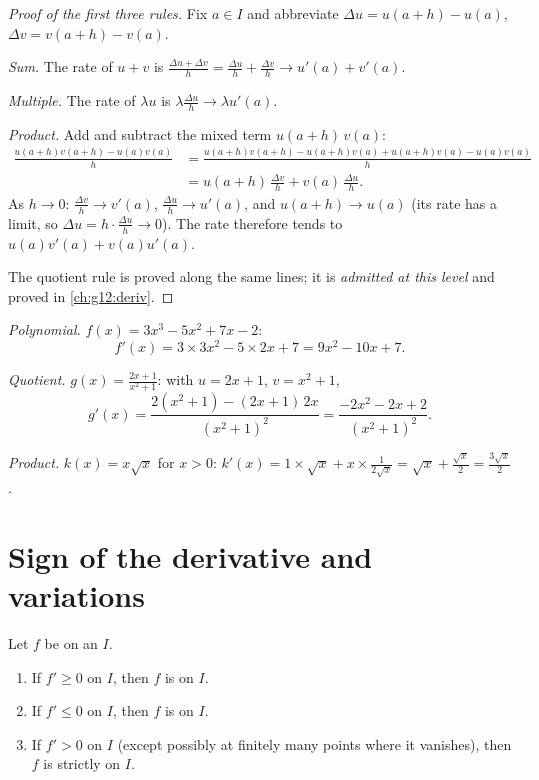 \begin{proof}[Proof of the first three rules]
Fix $a \in I$ and abbreviate $\Delta u = u(a+h) - u(a)$,
$\Delta v = v(a+h) - v(a)$.

\emph{Sum.} The rate of $u + v$ is
$\frac{\Delta u + \Delta v}{h} = \frac{\Delta u}{h} + \frac{\Delta v}{h}
\to u'(a) + v'(a)$.

\emph{Multiple.} The rate of $\lambda u$ is
$\lambda \frac{\Delta u}{h} \to \lambda u'(a)$.

\emph{Product.} Add and subtract the mixed term $u(a+h)\,v(a)$:
\begin{align*}
\frac{u(a+h)v(a+h) - u(a)v(a)}{h}
&= \frac{u(a+h)v(a+h) - u(a+h)v(a) + u(a+h)v(a) - u(a)v(a)}{h}\\
&= u(a+h)\,\frac{\Delta v}{h} + v(a)\,\frac{\Delta u}{h}.
\end{align*}
As $h \to 0$: $\frac{\Delta v}{h} \to v'(a)$, $\frac{\Delta u}{h} \to
u'(a)$, and $u(a+h) \to u(a)$ (its rate has a limit, so
$\Delta u = h \cdot \frac{\Delta u}{h} \to 0$). The rate therefore tends
to $u(a)v'(a) + v(a)u'(a)$.

The quotient rule is proved along the same lines; it is \emph{admitted at
this level} and proved in \cref{ch:g12:deriv}.
\end{proof}

\begin{example}\label{ex:g11:deriv:computations}
\emph{Polynomial.} $f(x) = 3x^3 - 5x^2 + 7x - 2$:
\[
f'(x) = 3 \times 3x^2 - 5 \times 2x + 7 = 9x^2 - 10x + 7 .
\]

\emph{Quotient.} $g(x) = \frac{2x+1}{x^2+1}$: with $u = 2x + 1$, $v = x^2
+ 1$,
\[
g'(x) = \frac{2(x^2+1) - (2x+1)\,2x}{(x^2+1)^2}
= \frac{-2x^2 - 2x + 2}{(x^2+1)^2}.
\]

\emph{Product.} $k(x) = x\sqrt x$ for $x > 0$:
$k'(x) = 1 \times \sqrt x + x \times \frac{1}{2\sqrt x}
= \sqrt x + \frac{\sqrt x}{2} = \frac{3\sqrt x}{2}$.
\end{example}

\section{Sign of the derivative and variations}

\begin{theorem}\label{thm:g11:deriv:variations}
Let $f$ be  on an  $I$.
\begin{enumerate}
  \item If $f' \geq 0$ on $I$, then $f$ is  on $I$.
  \item If $f' \leq 0$ on $I$, then $f$ is  on $I$.
  \item If $f' > 0$ on $I$ (except possibly at finitely many points where
        it vanishes), then $f$ is strictly  on $I$.
\end{enumerate}
\end{theorem}

